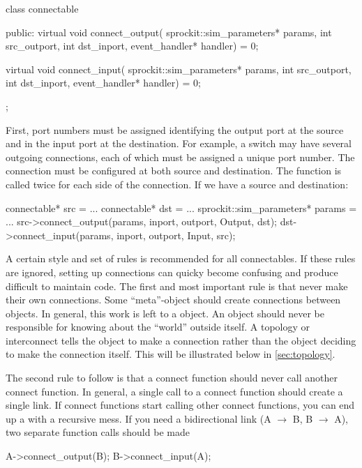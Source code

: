 \begin{CppCode}
class connectable
{
 public:
  virtual void connect_output(
    sprockit::sim_parameters* params,
    int src_outport,
    int dst_inport,
    event_handler* handler) = 0;

  virtual void
  connect_input(
    sprockit::sim_parameters* params,
    int src_outport,
    int dst_inport,
    event_handler* handler) = 0;


};
\end{CppCode}

First, port numbers must be assigned identifying the output port at the source and in the input port at the destination.
For example, a switch may have several outgoing connections, each of which must be assigned a unique port number.
The connection must be configured at both source and destination.
The function is called twice for each side of the connection. If we have a source and destination:

\begin{CppCode}
connectable* src = ...
connectable* dst = ...
sprockit::sim_parameters* params = ...
src->connect_output(params, inport, outport, Output, dst);
dst->connect_input(params, inport, outport, Input, src);
\end{CppCode}

A certain style and set of rules is recommended for all connectables.
If these rules are ignored, setting up connections can quicky become confusing and produce difficult to maintain code.
The first and most important rule is that  never make their own connections.
Some ``meta''-object should create connections between objects.
In general, this work is left to a  object.
An object should never be responsible for knowing about the ``world'' outside itself.
A topology or interconnect tells the object to make a connection rather than the object deciding to make the connection itself.
This will be illustrated below in \ref{sec:topology}.

The second rule to follow is that a connect function should never call another connect function.
In general, a single call to a connect function should create a single link.
If connect functions start calling other connect functions, you can end up a with a recursive mess.
If you need a bidirectional link (A $\rightarrow$ B, B $\rightarrow$ A),
two separate function calls should be made

\begin{CppCode}
A->connect_output(B);
B->connect_input(A);
\end{CppCode}

